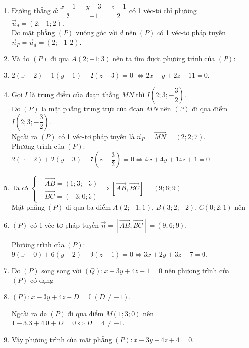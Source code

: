 \begin{vd}
{		\begin{enumerate}
			\item Đường thẳng $d\colon \dfrac{x+1}{2}=\dfrac{y-3}{-1}=\dfrac{z-1}{2}$ có 1 véc-tơ chỉ phương $\overrightarrow{u}_d=(2;-1;2)$.\\
			Do mặt phẳng $(P)$ vuông góc với $d$ nên $(P)$ có 1 véc-tơ pháp tuyến $\overrightarrow{n}_P=\overrightarrow{u}_d=(2;-1;2)$.\vspace{-0.1cm}
			\item[] Và do $(P)$ đi qua $A(2;-1;3)$ nên ta tìm được phương trình của $(P)$:
			\item[] \centerline{$2(x-2)-1(y+1)+2(z-3)=0$
				$ \Leftrightarrow 2x-y+2z-11=0$.}\vspace{-0.8cm}
			\item Gọi $I$ là trung điểm của đoạn thẳng $MN$ thì $I\left(2;3;-\dfrac{3}{2}\right)$.\\ 
			Do $(P)$ là mặt phẳng trung trực của đoạn $MN$ nên $(P)$ đi qua
			điểm $I\left(2;3;-\dfrac{3}{2}\right)$.\\
			Ngoài ra $(P)$ có 1 véc-tơ pháp tuyến là $\overrightarrow{n}_P=\overrightarrow{MN}=(2;2;7)$.\\
			Phương trình của $(P)$: $2(x-2)+2(y-3)+7\left(z+\dfrac{3}{2}\right)=0 \Leftrightarrow 4x+4y+14z+1=0$.\vspace{-0.4cm}
			\item Ta có $\left\{\begin{aligned}
			&\overrightarrow{AB}=(1;3;-3) \\
			&\overrightarrow{BC}=(-3;0;3)
			\end{aligned}\right. \Rightarrow \left[\overrightarrow{AB},\overrightarrow{BC}\right]=(9;6;9)$\\
			Mặt phẳng $(P)$ đi qua ba điểm $A(2;-1;1),\,B(3;2;-2),\,C(0;2;1)$
			nên 
			\item[] \centerline{$(P)$ có 1 véc-tơ pháp tuyến $\overrightarrow{n}=\left[\overrightarrow{AB},\overrightarrow{BC}\right]=(9;6;9)$.}
			Phương trình của $(P)$: $9(x-0)+6(y-2)+9(z-1)=0 \Leftrightarrow 3x+2y+3z-7=0$.
			\item Do $(P)$ song song với $(Q)\colon x-3y+4z-1=0$ nên phương trình của $(P)$ có dạng
			\item[] \centerline{$(P)\colon x-3y+4z+D=0~(D\ne -1)$.}
			Ngoài ra do $(P)$ đi qua điểm $M(1;3;0)$ nên
			$1-3.3+4.0+D=0 \Leftrightarrow D=4\ne -1$.\vspace{-0.1cm}
			\item[] Vậy phương trình của mặt phẳng $(P)\colon x-3y+4z+4=0$. \vspace{-0.05cm}

\end{enumerate}}
\end{vd}
